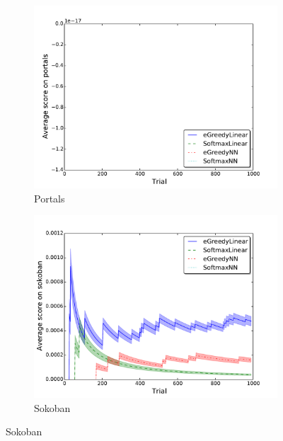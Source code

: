 \documentclass[conference]{IEEEtran}
\begin{document}
\begin{figure}[!t]
	\begin{center}

\begin{subfigure} {\lefig\textwidth}
	\includegraphics[width = \textwidth]{img/portals_scores}
  \caption{Portals}
\end{subfigure}\begin{subfigure} {\lefig\textwidth}
	\includegraphics[width = \textwidth]{img/sokoban_scores}
  \caption{Sokoban}
\end{subfigure}


\end{center}
\end{figure}
\end{document}
